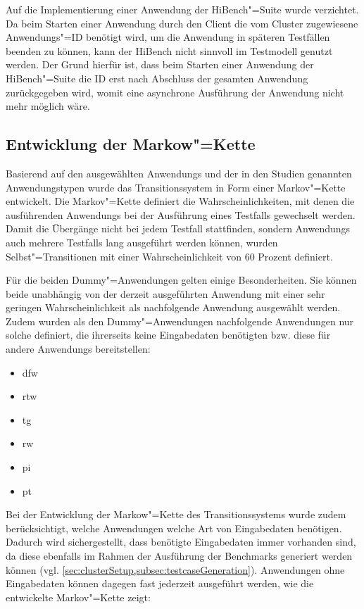 Auf die Implementierung einer \gls{Anwendung} der HiBench"=Suite wurde verzichtet.
Da beim Starten einer \gls{Anwendung} durch den Client die vom Cluster zugewiesene Anwendungs"=ID benötigt wird, um die \gls{Anwendung} in späteren Testfällen beenden zu können, kann der HiBench nicht sinnvoll im Testmodell genutzt werden.
Der Grund hierfür ist, dass beim Starten einer \gls{Anwendung} der HiBench"=Suite die ID erst nach Abschluss der gesamten \gls{Anwendung} zurückgegeben wird, womit eine asynchrone Ausführung der \gls{Anwendung} nicht mehr möglich wäre.

\subsection{Entwicklung der Markow"=Kette}
\label{subsec:markovChain}

Basierend auf den ausgewählten \glspl{Anwendung} und der in den Studien genannten Anwendungstypen wurde das Transitionssystem in Form einer Markov"=Kette entwickelt.
Die Markov"=Kette definiert die Wahrscheinlichkeiten, mit denen die ausführenden \glspl{Anwendung} bei der Ausführung eines Testfalls gewechselt werden.
Damit die Übergänge nicht bei jedem \gls{Testfall} stattfinden, sondern \glspl{Anwendung} auch mehrere \glspl{Testfall} lang ausgeführt werden können, wurden Selbst"=Transitionen mit einer Wahrscheinlichkeit von 60 Prozent definiert.

Für die beiden Dummy"=Anwendungen gelten einige Besonderheiten.
Sie können beide unabhängig von der derzeit ausgeführten \gls{Anwendung} mit einer sehr geringen Wahrscheinlichkeit als nachfolgende \gls{Anwendung} ausgewählt werden.
Zudem wurden als den Dummy"=Anwendungen nachfolgende Anwendungen nur solche definiert, die ihrerseits keine Eingabedaten benötigten bzw. diese für andere \glspl{Anwendung} bereitstellen:

\begin{itemize}
    \item \acrlong{dfw}
    \item \acrlong{rtw}
    \item \acrlong{tg}
    \item \acrlong{rw}
    \item \acrlong{pi}
    \item \acrlong{pt}
\end{itemize}

Bei der Entwicklung der Markow"=Kette des Transitionssystems wurde zudem berücksichtigt, welche Anwendungen welche Art von Eingabedaten benötigen.
Dadurch wird sichergestellt, dass benötigte Eingabedaten immer vorhanden sind, da diese ebenfalls im Rahmen der Ausführung der Benchmarks generiert werden können (vgl. \cref{sec:clusterSetup,subsec:testcaseGeneration}).
Anwendungen ohne Eingabedaten können dagegen fast jederzeit ausgeführt werden, wie die entwickelte Markov"=Kette zeigt:

